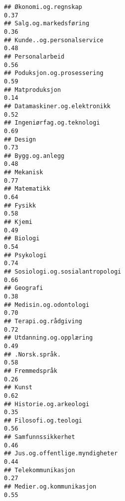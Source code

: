 \documentclass[
]{article}
\begin{document}
\begin{verbatim}
## Økonomi.og.regnskap                                                              0.37
## Salg.og.markedsføring                                                            0.36
## Kunde..og.personalservice                                                        0.48
## Personalarbeid                                                                   0.56
## Poduksjon.og.prosessering                                                        0.59
## Matproduksjon                                                                    0.14
## Datamaskiner.og.elektronikk                                                      0.52
## Ingeniørfag.og.teknologi                                                         0.69
## Design                                                                           0.73
## Bygg.og.anlegg                                                                   0.48
## Mekanisk                                                                         0.77
## Matematikk                                                                       0.64
## Fysikk                                                                           0.58
## Kjemi                                                                            0.49
## Biologi                                                                          0.54
## Psykologi                                                                        0.74
## Sosiologi.og.sosialantropologi                                                   0.66
## Geografi                                                                         0.38
## Medisin.og.odontologi                                                            0.70
## Terapi.og.rådgiving                                                              0.72
## Utdanning.og.opplæring                                                           0.49
## .Norsk.språk.                                                                    0.58
## Fremmedspråk                                                                     0.26
## Kunst                                                                            0.62
## Historie.og.arkeologi                                                            0.35
## Filosofi.og.teologi                                                              0.56
## Samfunnssikkerhet                                                                0.46
## Jus.og.offentlige.myndigheter                                                    0.44
## Telekommunikasjon                                                                0.27
## Medier.og.kommunikasjon                                                          0.55

\end{verbatim}
\end{document}
